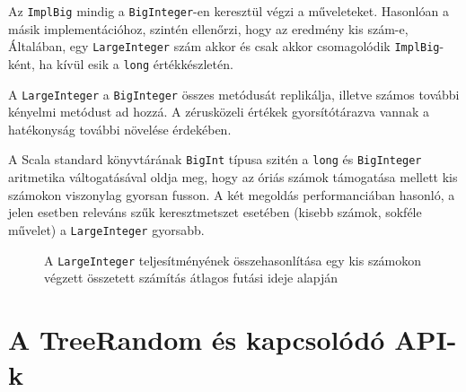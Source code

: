 \documentclass[
    parspace,
    noindent,
    nohyp,
]{elteiktdk}[2023/04/10]
\begin{document}
Az \texttt{ImplBig} mindig a \texttt{BigInteger}-en keresztül végzi a műveleteket.
Hasonlóan a másik implementációhoz, szintén ellenőrzi, hogy az eredmény kis szám-e,
Általában, egy \texttt{LargeInteger} szám akkor és csak akkor csomagolódik \texttt{ImplBig}-ként,
ha kívül esik a \texttt{long} értékkészletén.

A \texttt{LargeInteger} a \texttt{BigInteger} összes metódusát replikálja,
illetve számos további kényelmi metódust ad hozzá.
A zérusközeli értékek gyorsítótárazva vannak a hatékonyság további növelése érdekében.

A Scala standard könyvtárának \texttt{BigInt} típusa szitén a \texttt{long} és \texttt{BigInteger}
aritmetika váltogatásával oldja meg,
hogy az óriás számok támogatása mellett kis számokon viszonylag gyorsan fusson.
A két megoldás performanciában hasonló,
a jelen esetben releváns szűk keresztmetszet esetében (kisebb számok, sokféle művelet)
a \texttt{LargeInteger} gyorsabb.

\begin{figure}[H]
    \centering
    \caption{
        A \texttt{LargeInteger} teljesítményének összehasonlítása
        egy kis számokon végzett összetett számítás átlagos futási ideje alapján
    }
\end{figure}


\section{A TreeRandom és kapcsolódó API-k}
\end{document}
